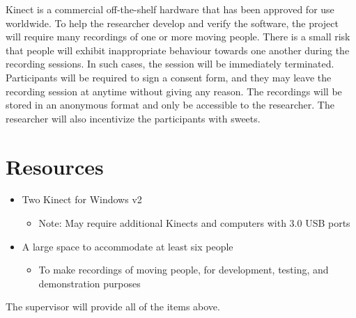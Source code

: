 \documentclass[paper=a4, fontsize=11pt]{scrartcl}
\numberwithin{equation}{section}
\numberwithin{figure}{section}
\numberwithin{table}{section}
\begin{document}
Kinect is a commercial off-the-shelf hardware that has been approved for use worldwide. To help the researcher develop and verify the software, the project will require many recordings of one or more moving people. There is a small risk that people will exhibit inappropriate behaviour towards one another during the recording sessions. In such cases, the session will be immediately terminated. Participants will be required to sign a consent form, and they may leave the recording session at anytime without giving any reason. The recordings will be stored in an anonymous format and only be accessible to the researcher. The researcher will also incentivize the participants with sweets.

\section{Resources}

\begin{itemize}
	\item Two Kinect for Windows v2
		\begin{itemize}
			\item Note: May require additional Kinects and computers with 3.0 USB ports
		\end{itemize}
	\item A large space to accommodate at least six people
		\begin{itemize}
			\item To make recordings of moving people, for development, testing, and demonstration purposes
		\end{itemize}
\end{itemize}

The supervisor will provide all of the items above.



\end{document}
